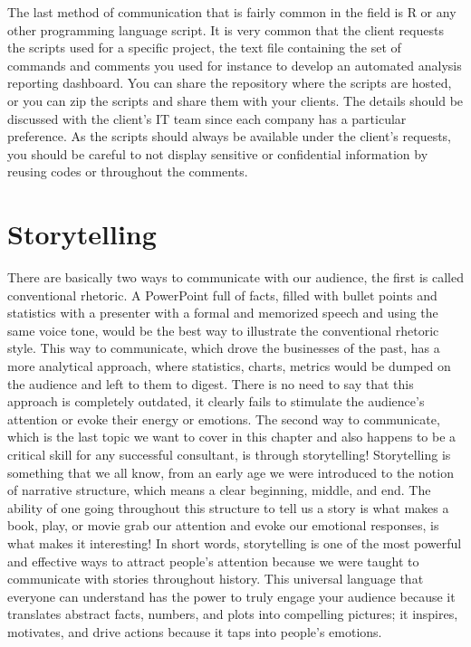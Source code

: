 \documentclass[
]{krantz}
\begin{document}
The last method of communication that is fairly common in the field is R or any other programming language script. It is very common that the client requests the scripts used for a specific project, the text file containing the set of commands and comments you used for instance to develop an automated analysis reporting dashboard. You can share the repository where the scripts are hosted, or you can zip the scripts and share them with your clients. The details should be discussed with the client's IT team since each company has a particular preference. As the scripts should always be available under the client's requests, you should be careful to not display sensitive or confidential information by reusing codes or throughout the comments.

\hypertarget{storytelling}{%
\section{Storytelling}\label{storytelling}}

There are basically two ways to communicate with our audience, the first is called conventional rhetoric. A PowerPoint full of facts, filled with bullet points and statistics with a presenter with a formal and memorized speech and using the same voice tone, would be the best way to illustrate the conventional rhetoric style. This way to communicate, which drove the businesses of the past, has a more analytical approach, where statistics, charts, metrics would be dumped on the audience and left to them to digest. There is no need to say that this approach is completely outdated, it clearly fails to stimulate the audience's attention or evoke their energy or emotions.
The second way to communicate, which is the last topic we want to cover in this chapter and also happens to be a critical skill for any successful consultant, is through storytelling! Storytelling is something that we all know, from an early age we were introduced to the notion of narrative structure, which means a clear beginning, middle, and end. The ability of one going throughout this structure to tell us a story is what makes a book, play, or movie grab our attention and evoke our emotional responses, is what makes it interesting! In short words, storytelling is one of the most powerful and effective ways to attract people's attention because we were taught to communicate with stories throughout history. This universal language that everyone can understand has the power to truly engage your audience because it translates abstract facts, numbers, and plots into compelling pictures; it inspires, motivates, and drive actions because it taps into people's emotions.
\end{document}
